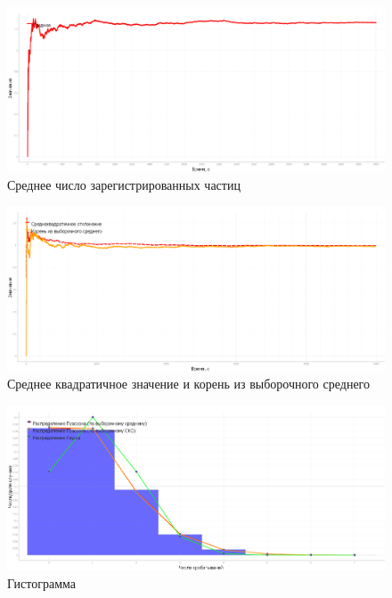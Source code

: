 \documentclass[a4paper, 12pt]{article}
\begin{document}
\begin{figure}[H]
\centering
\includegraphics[width=1\linewidth]{images/experiment_graph_02.png}
\caption{Среднее число зарегистрированных частиц}
\label{srednee}
\end{figure}

\begin{figure}[H]
\centering
\includegraphics[width=1\linewidth]{images/sr_puas.png}
\caption{Среднее квадратичное значение и корень из выборочного среднего}
\label{sr_puas}
\end{figure}

\begin{figure}[H]
\centering
\includegraphics[width=1\linewidth]{images/t_1.png}
\caption{Гистограмма}
\label{gistogramma_t1}
\end{figure}
\end{document}
